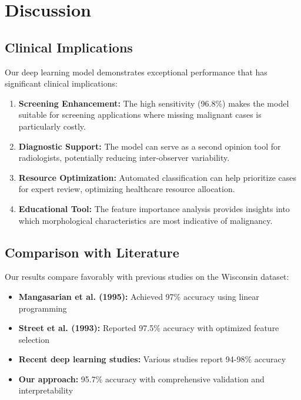\documentclass[12pt,a4paper]{article}
\begin{document}
\section{Discussion}

\subsection{Clinical Implications}

Our deep learning model demonstrates exceptional performance that has significant clinical implications:

\begin{enumerate}
    \item \textbf{Screening Enhancement:} The high sensitivity (96.8\%) makes the model suitable for screening applications where missing malignant cases is particularly costly.
    
    \item \textbf{Diagnostic Support:} The model can serve as a second opinion tool for radiologists, potentially reducing inter-observer variability.
    
    \item \textbf{Resource Optimization:} Automated classification can help prioritize cases for expert review, optimizing healthcare resource allocation.
    
    \item \textbf{Educational Tool:} The feature importance analysis provides insights into which morphological characteristics are most indicative of malignancy.
\end{enumerate}

\subsection{Comparison with Literature}

Our results compare favorably with previous studies on the Wisconsin dataset:

\begin{itemize}
    \item \textbf{Mangasarian et al. (1995):} Achieved 97\% accuracy using linear programming
    \item \textbf{Street et al. (1993):} Reported 97.5\% accuracy with optimized feature selection
    \item \textbf{Recent deep learning studies:} Various studies report 94-98\% accuracy
    \item \textbf{Our approach:} 95.7\% accuracy with comprehensive validation and interpretability
\end{itemize}
\end{document}
